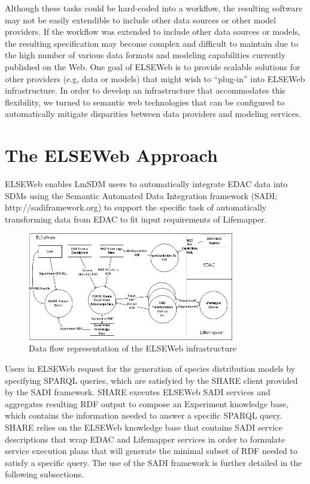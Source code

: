 \documentclass[letterpaper]{article}
\begin{document}
Although these tasks could be hard-coded into a workflow, the resulting software may not be easily extendible to include other data sources or other model providers. If the workflow was extended to include other data sources or models, the resulting specification may become complex and difficult to maintain due to the high number of various data formats and modeling capabilities currently published on the Web. One goal of ELSEWeb is to provide scalable solutions for other providers (e.g, data or models) that might wish to ``plug-in'' into ELSEWeb infrastructure. In order to develop an infrastructure that accommodates this flexibility, we turned to semantic web technologies that can be configured to automatically mitigate disparities between data providers and modeling services.

\section{The ELSEWeb Approach}
ELSEWeb enables LmSDM users to automatically integrate EDAC data into SDMs using the Semantic Automated Data Integration framework (SADI; http://sadiframework.org) \cite{wilkinson2011semantic} to support the specific task of automatically transforming data from EDAC to fit input requirements of Lifemapper. 
\begin{figure}[H]
\center
\includegraphics[width=90mm]{images/elseweb-flow.png}
\caption{Data flow representation of the ELSEWeb infrastructure}
\label{fig:elseweb-flow}
\end{figure}


Users in ELSEWeb request for the generation of species distribution models by specifying SPARQL \cite{prud2008sparql} queries, which are satisfyied by the SHARE client \cite{vandervalk2010share} provided by the SADI framework. SHARE executes ELSEWeb SADI services and aggregates resulting RDF output to compose an Experiment knowledge base, which contains the information needed to answer a specific SPARQL query. SHARE relies on the ELSEWeb knowledge base that contains SADI service descriptions that wrap EDAC and Lifemapper services in order to formulate service execution plans that will generate the minimal subset of RDF needed to satisfy a specific query. The use of the SADI framework is further detailed in the following subsections.
\end{document}
